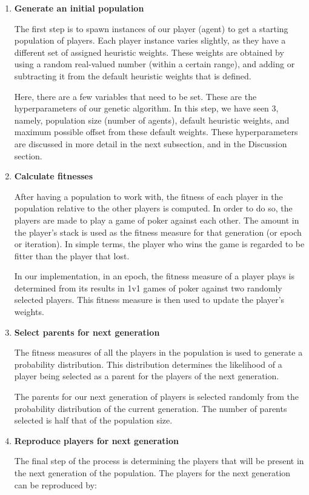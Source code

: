 \documentclass{article}
\begin{document}
\begin{enumerate}
\item{{\bf Generate an initial population}

    The first step is to spawn instances of our player (agent) to get a starting population of players. Each player instance varies slightly, as they have a different set of assigned heuristic weights. These weights are obtained by using a random real-valued number (within a certain range), and adding or subtracting it from the default heuristic weights that is defined.
    
    Here, there are a few variables that need to be set. These are the hyperparameters of our genetic algorithm. In this step, we have seen 3, namely, population size (number of agents), default heuristic weights, and maximum possible offset from these default weights. These hyperparameters are discussed in more detail in the next subsection, and in the Discussion section.
}
\item{{\bf Calculate fitnesses}

    After having a population to work with, the fitness of each player in the population relative to the other players is computed. In order to do so, the players are made to play a game of poker against each other. The amount in the player’s stack is used as the fitness measure for that generation (or epoch or iteration). In simple terms, the player who wins the game is regarded to be fitter than the player that lost.
    
    In our implementation, in an epoch, the fitness measure of a player plays is determined from its results in 1v1 games of poker against two randomly selected players. This fitness measure is then used to update the player’s weights.
}
\item{{\bf Select parents for next generation}

    The fitness measures of all the players in the population is used to generate a probability distribution. This distribution determines the likelihood of a player being selected as a parent for the players of the next generation.

    The parents for our next generation of players is selected randomly from the probability distribution of the current generation. The number of parents selected is half that of the population size.
}
\item{{\bf Reproduce players for next generation}

    The final step of the process is determining the players that will be present in the next generation of the population. The players for the next generation can be reproduced by:

}
\end{enumerate}
\end{document}
